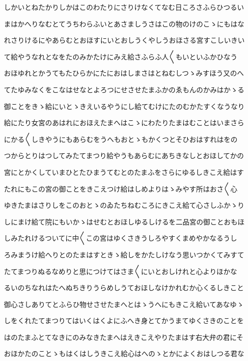 \documentclass[a4paper,11pt,landscape]{ltjtarticle}
\begin{document}
しかいとねたかりしかはこのわたりにさりけなくてなむ日ころさふらひつるい
\par\medskip
まはかへりなむとてうちわらふいとあさましうさはこの物のけのこゝにもはな
\par\medskip
れさりけるにやあらむとおほすにいとおしうくやしうおほさる宮すこしいきい
\par\medskip
て給やうなれとなをたのみかたけにみえ給さふらふ人〱もいといふかひなう
\par\medskip
おほゆれとかうてもたひらかにたにおはしまさはとねむしつゝみすほう又のへ
\par\medskip
てたゆみなくをこなはせなとよろつにせさせたまふかのゑもんのかみはかゝる
\par\medskip
御ことをきゝ給にいとゝきえいるやうにし給てむけにたのむかたすくなうなり
\par\medskip
給にたり女宮のあはれにおほえたまへはこゝにわたりたまはむことはいまさら
\par\medskip
にかる〱しきやうにもあらむをうへもおとゝもかくつとそひおはすれはをの
\par\medskip
つからとりはつしてみたてまつり給やうもあらむにあちきなしとおほしてかの
\par\medskip
宮にとかくしていまひとたひまうてむとのたまふをさらにゆるしきこえ給はす
\par\medskip
たれにもこの宮の御ことをきこえつけ給はしめよりはゝみやす所はおさ〱心
\par\medskip
ゆきたまはさりしをこのおとゝのゐたちねむころにきこえ給て心さしふかゝり
\par\medskip
しにまけ給て院にもいかゝはせむとおほしゆるしけるを二品宮の御ことおもほ
\par\medskip
しみたれけるついてに中〱この宮はゆくさきうしろやすくまめやかなるうし
\par\medskip
ろみまうけ給へりとのたまはすときゝ給しをかたしけなう思いつかくてみすて
\par\medskip
たてまつりぬるなめりと思につけてはさま〱にいとおしけれと心よりほかな
\par\medskip
るいのちなれはたへぬちきりうらめしうておほしなけかれむか心くるしきこと
\par\medskip
御心さしありてとふらひ物せさせたまへとはゝうへにもきこえ給いてあなゆゝ
\par\medskip
しをくれたてまつりてはいくはくよにふへき身とてかうまてゆくさきのことを
\par\medskip
はのたまふとてなきにのみなきたまへはえきこえやりたまはす右大弁の君にそ
\par\medskip
おほかたのことゝもはくはしうきこえ給心はへのゝとかによくおはしつる君な
\end{document}
